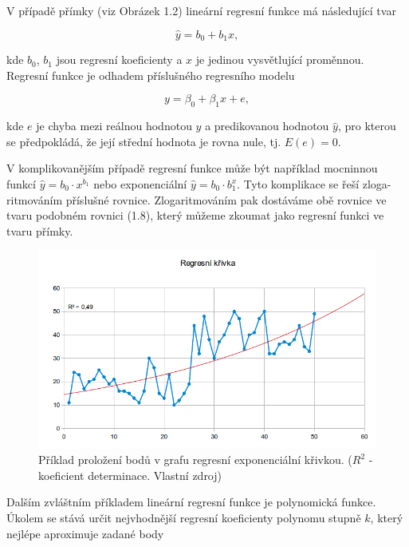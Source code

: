 \documentclass[a4paper,12pt,twoside]{scrreprt}
\begin{document}
V případě přímky (viz Obrázek 1.2) lineární regresní funkce má následující tvar

\begin{equation}
\hat{y} = b_0 + b_1x,
\end{equation}

kde $b_0$, $b_1$ jsou regresní koeficienty a $x$ je jedinou vysvětlující proměnnou. Regresní funkce je odhadem příslušného regresního modelu

\begin{equation}
y = \beta_0 + \beta_1x + e,
\end{equation}

kde $e$ je chyba mezi reálnou hodnotou $y$ a predikovanou hodnotou $\hat{y}$, pro kterou se předpokládá, že její střední hodnota je rovna nule, tj. $E(e) = 0$.

V komplikovanějším případě regresní funkce může být například mocninnou funkcí $\hat{y} = b_0 \cdot x^{b_1}$ nebo exponenciální $\hat{y} = b_0 \cdot b_1^x$. Tyto komplikace se řeší zloga-ritmováním příslušné rovnice. Zlogaritmováním pak dostáváme obě rovnice ve tvaru podobném rovnici (1.8), který můžeme zkoumat jako regresní funkci ve tvaru přímky.

\begin{figure}[h]
  \centering
  \includegraphics[width=15cm]{pictures/krivka.png}
  \caption{Příklad proložení bodů v grafu regresní exponenciální křivkou. \newline($R^2$ - koeficient determinace. Vlastní zdroj)}
  \label{fig:křivka}
\end{figure}

Dalším zvláštním příkladem lineární regresní funkce je polynomická funkce. Úkolem se stává určit nejvhodnější regresní koeficienty polynomu stupně $k$, který nejlépe aproximuje zadané body
\end{document}

